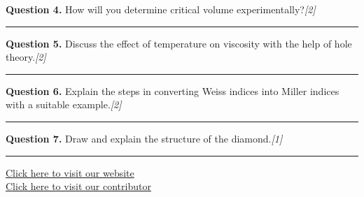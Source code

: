 \documentclass[11pt,a4paper]{article}
\newcommand{\pts}[1]{\hfill   \textit{[#1]}}
\begin{document}
\noindent   \textbf{Question 4.} How will you determine critical volume experimentally?\pts{2}

\medskip\rule{\linewidth}{0.2pt}\medskip




\noindent   \textbf{Question 5.} Discuss the effect of temperature on viscosity with the help of hole theory.\pts{2}

\medskip\rule{\linewidth}{0.2pt}\medskip




\noindent   \textbf{Question 6.} Explain the steps in converting Weiss indices into Miller indices with a suitable example.\pts{2}

\medskip\rule{\linewidth}{0.2pt}\medskip




\noindent   \textbf{Question 7.} Draw and explain the structure of the diamond.\pts{1}

\vfill
\rule{\linewidth}{0.4pt}

\begin{center}\small
\href{https://bhu-exam.vercel.app/}{Click here to visit our website}\\[4pt]
\href{https://me-aryan.vercel.app/}{Click here to visit our contributor}
\end{center}
\end{document}

